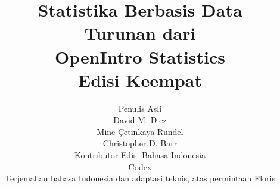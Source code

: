 

\title{\huge Statistika Berbasis Data \\[2mm]
\large Turunan dari \\
OpenIntro Statistics \\
Edisi Keempat}
\author{\Large Penulis Asli \\[1.5mm]
\normalsize David M. Diez \\
\normalsize Mine \c{C}etinkaya-Rundel \\
\normalsize Christopher D. Barr \\[8mm]
\Large Kontributor Edisi Bahasa Indonesia \\[1.5mm]
\normalsize Codex \\
\small Terjemahan bahasa Indonesia dan adaptasi teknis, atas permintaan Floris \\[2mm]
}
